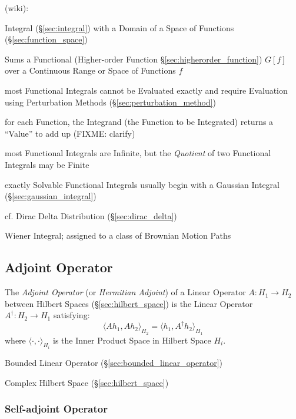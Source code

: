 (wiki):

Integral (\S\ref{sec:integral}) with a Domain of a Space of Functions
(\S\ref{sec:function_space})

Sums a Functional (Higher-order Function \S\ref{sec:higherorder_function})
$G[f]$ over a Continuous Range or Space of Functions $f$

most Functional Integrals cannot be Evaluated exactly and require Evaluation
using Perturbation Methods (\S\ref{sec:perturbation_method})

for each Function, the Integrand (the Function to be Integrated) returns a
``Value'' to add up (FIXME: clarify)

most Functional Integrals are Infinite, but the \emph{Quotient} of two
Functional Integrals may be Finite

exactly Solvable Functional Integrals usually begin with a Gaussian Integral
(\S\ref{sec:gaussian_integral})

cf. Dirac Delta Distribution (\S\ref{sec:dirac_delta})

Wiener Integral; assigned to a class of Brownian Motion Paths



\subsection{Adjoint Operator}\label{sec:adjoint_operator}

The \emph{Adjoint Operator} (or \emph{Hermitian Adjoint}) of a
Linear Operator $A : H_1 \rightarrow H_2$ between Hilbert Spaces
(\S\ref{sec:hilbert_space}) is the Linear Operator $A^\dag : H_2 \rightarrow
H_1$ satisfying:
\[
  \langle{Ah_1,Ah_2}\rangle_{H_2} = \langle{h_1,A^{\dag}h_2}\rangle_{H_1}
\]
where $\langle\cdot,\cdot\rangle_{H_i}$ is the Inner Product Space in Hilbert
Space $H_i$.


Bounded Linear Operator (\S\ref{sec:bounded_linear_operator})

Complex Hilbert Space (\S\ref{sec:hilbert_space})



\subsubsection{Self-adjoint Operator}\label{sec:self_adjoint_operator}

